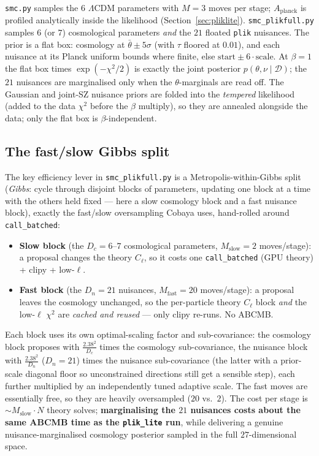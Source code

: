 \documentclass[11pt]{article}
\newcommand{\code}[1]{\texttt{\small #1}}
\newcommand{\Cl}{C_\ell}
\newcommand{\chisq}{\chi^2}
\begin{document}
\code{smc.py} samples the $6$ $\Lambda$CDM parameters with $M=3$ moves per
stage; $A_{\mathrm{planck}}$ is profiled analytically inside the
likelihood (Section~\ref{sec:pliklite}). \code{smc\_plikfull.py} samples
$6$ (or $7$) cosmological parameters \emph{and} the $21$ floated
\code{plik} nuisances. The prior is a flat box: cosmology at
$\bar\theta\pm5\sigma$ (with $\tau$ floored at $0.01$), and each nuisance
at its Planck uniform bounds where finite, else
$\mathrm{start}\pm6\cdot\mathrm{scale}$. At $\beta=1$ the flat box times
$\exp(-\chisq/2)$ is exactly the joint posterior
$p(\theta,\nu\mid\mathcal D)$; the $21$ nuisances are marginalised only when
the $\theta$-marginals are read off. The
Gaussian and joint-SZ nuisance priors are folded into the \emph{tempered}
likelihood (added to the data $\chisq$ before the $\beta$ multiply), so
they are annealed alongside the data; only the flat box is
$\beta$-independent.

\subsection{The fast/slow Gibbs split}
\label{sec:fastslow}

The key efficiency lever in \code{smc\_plikfull.py} is a
Metropolis-within-Gibbs split (\emph{Gibbs}: cycle through disjoint blocks
of parameters, updating one block at a time with the others held fixed ---
here a slow cosmology block and a fast nuisance block), exactly the
fast/slow oversampling Cobaya uses, hand-rolled around \code{call\_batched}:
\begin{itemize}[leftmargin=1.5em,itemsep=2pt]
\item \textbf{Slow block} (the $D_c=6$--$7$ cosmological parameters,
$M_{\mathrm{slow}}=2$ moves/stage): a proposal changes the theory $\Cl$,
so it costs one \code{call\_batched} (GPU theory) + clipy + low-$\ell$.
\item \textbf{Fast block} (the $D_n=21$ nuisances,
$M_{\mathrm{fast}}=20$ moves/stage): a proposal leaves the cosmology
unchanged, so the per-particle theory $\Cl$ block \emph{and} the
low-$\ell$ $\chisq$ are \emph{cached and reused} --- only clipy re-runs.
No \textsc{ABCMB}.
\end{itemize}
Each block uses its own optimal-scaling factor and sub-covariance: the
cosmology block proposes with $\frac{2.38^2}{D_c}$ times the cosmology
sub-covariance, the nuisance block with $\frac{2.38^2}{D_n}$ ($D_n=21$)
times the nuisance sub-covariance (the latter with a prior-scale diagonal
floor so unconstrained directions still get a sensible step), each further
multiplied by an independently tuned adaptive scale. The fast moves are
essentially free, so they are heavily oversampled ($20$ vs.\ $2$). The
cost per stage is $\sim M_{\mathrm{slow}}\cdot N$ theory solves;
\textbf{marginalising the $21$ nuisances costs about the same \textsc{ABCMB}
time as the \code{plik\_lite} run}, while delivering a genuine
nuisance-marginalised cosmology posterior sampled in the full
$27$-dimensional space.
\end{document}
